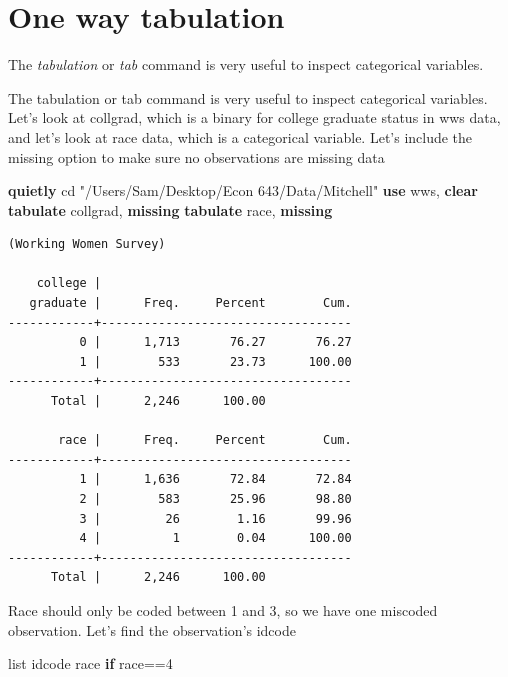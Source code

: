 \documentclass[
]{book}
\newenvironment{Shaded}{\begin{snugshade}}{\end{snugshade}}
\newcommand{\FunctionTok}[1]{\textcolor[rgb]{0.13,0.29,0.53}{\textbf{#1}}}
\newcommand{\KeywordTok}[1]{\textcolor[rgb]{0.13,0.29,0.53}{\textbf{#1}}}
\newcommand{\NormalTok}[1]{#1}
\newcommand{\OtherTok}[1]{\textcolor[rgb]{0.56,0.35,0.01}{#1}}
\newcommand{\StringTok}[1]{\textcolor[rgb]{0.31,0.60,0.02}{#1}}
\begin{document}
\section{One way tabulation}\label{one-way-tabulation}

The \emph{tabulation} or \emph{tab} command is very useful to inspect categorical variables.

The tabulation or tab command is very useful to inspect categorical variables.
Let's look at collgrad, which is a binary for college graduate status in wws data, and let's look at race data, which is a categorical variable. Let's include the missing option to make sure no observations are missing data

\begin{Shaded}
\begin{Highlighting}[]
\KeywordTok{quietly}\NormalTok{ cd }\StringTok{"/Users/Sam/Desktop/Econ 643/Data/Mitchell"}
\KeywordTok{use}\NormalTok{ wws, }\KeywordTok{clear}
\KeywordTok{tabulate}\NormalTok{ collgrad, }\FunctionTok{missing}
\KeywordTok{tabulate}\NormalTok{ race, }\FunctionTok{missing}
\end{Highlighting}
\end{Shaded}

\begin{verbatim}
(Working Women Survey)

    college |
   graduate |      Freq.     Percent        Cum.
------------+-----------------------------------
          0 |      1,713       76.27       76.27
          1 |        533       23.73      100.00
------------+-----------------------------------
      Total |      2,246      100.00

       race |      Freq.     Percent        Cum.
------------+-----------------------------------
          1 |      1,636       72.84       72.84
          2 |        583       25.96       98.80
          3 |         26        1.16       99.96
          4 |          1        0.04      100.00
------------+-----------------------------------
      Total |      2,246      100.00
\end{verbatim}

Race should only be coded between 1 and 3, so we have one miscoded observation.
Let's find the observation's idcode

\begin{Shaded}
\begin{Highlighting}[]
\OtherTok{list}\NormalTok{ idcode race }\KeywordTok{if}\NormalTok{ race==4}
\end{Highlighting}
\end{Shaded}
\end{document}
